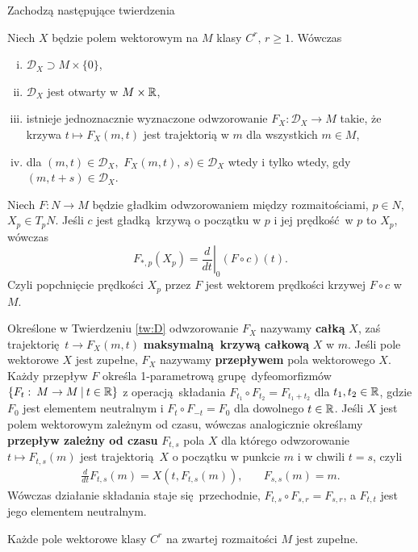Zachodzą następujące twierdzenia

\begin{twierdzenie}\label{tw:D}
Niech \(X\) będzie polem wektorowym na \(M\) klasy \(C^r,\, r\geq1\). Wówczas
\begin{enumerate}[i)]
\item \(\mathcal{D}_X\supset M\times \{0\}\),
\item \(\mathcal{D}_X\) jest otwarty w \(M\times \mathbb{R}\),
\item istnieje jednoznacznie wyznaczone odwzorowanie \(F_X:\mathcal{D}_X\rightarrow M\) takie, że krzywa \(t\mapsto F_X(m,t)\) jest trajektorią w \(m\) dla wszystkich \(m\in M\),
\item dla \((m,t)\in \mathcal{D}_X,\) \(F_X(m,t),\, s)\in\mathcal{D}_X\) wtedy i tylko wtedy, gdy \((m, t+s)\in \mathcal{D}_X\).
\end{enumerate}
\end{twierdzenie}  

\begin{twierdzenie}
Niech \(F: N\to M\) będzie gładkim odwzorowaniem między rozmaitościami, \(p\in N\), \(X_p\in T_p N\). Jeśli \(c\) jest gładką krzywą o początku w \(p\) i jej prędkość w \(p\) to \(X_p\), wówczas
\begin{equation}
F_{\ast, p} (X_p) = \left.\frac{d}{dt}\right|_0(F\circ c)(t).
\end{equation}
Czyli popchnięcie prędkości \(X_p\) przez \(F\) jest wektorem prędkości krzywej \(F\circ c\) w \(M\).
\end{twierdzenie}

Określone w Twierdzeniu \ref{tw:D} odwzorowanie \(F_X\) nazywamy \textbf{całką} \(X\), zaś trajektorię \(t\rightarrow F_X(m,t)\) \textbf{maksymalną krzywą całkową} \(X\) w \(m\). Jeśli pole wektorowe \(X\) jest zupełne, \(F_X\) nazywamy \textbf{przepływem} pola wektorowego \(X\). Każdy przepływ \(F\) określa 1-parametrową grupę dyfeomorfizmów \(\{F_t:\:M\rightarrow M\:|\: t\in \mathbb{R}\}\) z operacją składania \(F_{t_1}\circ F_{t_2} = F_{t_1 + t_2}\) dla \(t_{1}, {t}_2 \in \mathbb{R}\), gdzie \(F_0\) jest elementem neutralnym i \(F_{t}\circ F_{-t} = F_{0}\) dla dowolnego \(t\in\mathbb{R}\). Jeśli \(X\) jest polem wektorowym zależnym od czasu, wówczas analogicznie określamy \textbf{przepływ zależny od czasu} \(F_{t,s}\) pola \(X\) dla którego odwzorowanie \(t\mapsto F_{t,s}(m)\) jest trajektorią \(X\) o początku w punkcie \(m\) i w chwili \(t=s\), czyli
\begin{align}
\frac{d}{dt}F_{t,s}(m) = X\left(t, F_{t,s}(m)\right), &\quad F_{s,s}(m) = m.
\end{align} 
Wówczas działanie składania staje się przechodnie, \(F_{t,s}\circ F_{s,r} = F_{s, r}\), a \(F_{t, t}\) jest jego elementem neutralnym. 
\begin{twierdzenie}
Każde pole wektorowe klasy \(C^r\) na zwartej rozmaitości \(M\) jest zupełne.
\end{twierdzenie}

